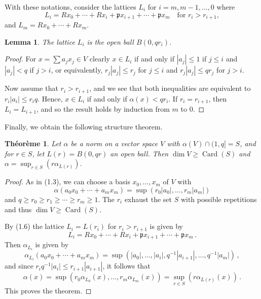 \documentclass[12pt,a4paper]{article}
\theoremstyle{plain}
\newtheorem{theorem}{Th\'eor\`eme}[section]
\newtheorem{lemma}{Lemma}[section]
\theoremstyle{definition}
\theoremstyle{remark}
\DeclareMathOperator{\Card}{Card}
\begin{document}
With these notations, consider the lattices $L_i$ for $i = m, m-1, \ldots, 0$ 
where
\[
L_i = Rx_0 + \cdots + Rx_i + \mathfrak{p}x_{i+1} + \cdots + \mathfrak{p}x_m \quad\text{for } r_i > r_{i+1},
\]
and $L_m = Rx_0 + \cdots + Rx_m$.

\begin{lemma}
The lattice $L_i$ is the open ball $B(0, qr_i)$.
\end{lemma}

\begin{proof}
For $x = \sum a_j x_j \in V$ clearly $x \in L_i$ if and only if $|a_j| \leqslant 1$ 
if $j \leqslant i$ and $|a_j| < q$ if $j > i$, or equivalently, $r_j|a_j| \leqslant r_j$ 
for $j \leqslant i$ and $r_j|a_j| \leqslant qr_j$ for $j > i$.

Now assume that $r_i > r_{i+1}$, and we see that both inequalities are 
equivalent to $r_i|a_i| \leqslant r_i q$. Hence, $x \in L_i$ if and only if 
$\alpha(x) < qr_i$. If $r_i = r_{i+1}$, then $L_i = L_{i+1}$, and so the 
result holds by induction from $m$ to $0$.
\end{proof}

Finally, we obtain the following structure theorem.

\begin{theorem}
Let $\alpha$ be a norm on a vector space $V$ with $\alpha(V) \cap (1,q] = S$, 
and for $r \in S$, let $L(r) = B(0,qr)$ an open ball. Then 
$\dim V \geqslant \Card(S)$ and $\alpha = \sup_{r \in S}(r\alpha_{L(r)})$.
\end{theorem}

\begin{proof}
As in (1.3), we can choose a basis $x_0, \ldots, x_m$ of $V$ with
\[
\alpha(a_0 x_0 + \cdots + a_m x_m) = \sup(r_0|a_0|, \ldots, r_m|a_m|)
\]
and $q \geqslant r_0 \geqslant r_1 \geqslant \cdots \geqslant r_m \geqslant 1$. The $r_i$ exhaust 
the set $S$ with possible repetitions and thus $\dim V \geqslant \Card(S)$.

By (1.6) the lattice $L_i = L(r_i)$ for $r_i > r_{i+1}$ is given by
\[
L_i = Rx_0 + \cdots + Rx_i + \mathfrak{p}x_{i+1} + \cdots + \mathfrak{p}x_m \,.
\]
Then $\alpha_{L_i}$ is given by
\[
\alpha_{L_i}(a_0 x_0 + \cdots + a_m x_m) = \sup(|a_0|, \ldots, |a_i|, q^{-1}|a_{i+1}|, \ldots, q^{-1}|a_m|) \,,
\]
and since $r_i q^{-1}|a_i| \leqslant r_{i+1}|a_{i+1}|$, it follows that
\[
\alpha(x) = \sup(r_0\alpha_{L_0}(x), \ldots, r_m\alpha_{L_m}(x)) = \sup_{r \in S}(r\alpha_{L(r)}(x)) \,.
\]
This proves the theorem.
\end{proof}
\end{document}

